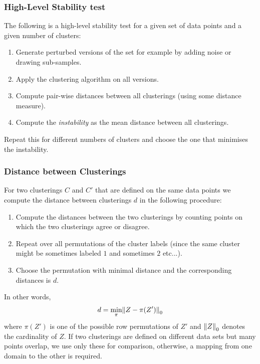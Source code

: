 \subsubsection{High-Level Stability test}
The following is a high-level stability test for a given set of data points and a given number of clusters:
\begin{enumerate}
    \item Generate perturbed versions of the set for example by adding noise or drawing sub-samples.
    \item Apply the clustering algorithm on all versions.
    \item Compute pair-wise distances between all clusterings (using some distance measure).
    \item Compute the \emph{instability} as the mean distance between all clusterings.
\end{enumerate}
Repeat this for different numbers of clusters and choose the one that minimises the instability.
\subsubsection{Distance between Clusterings}
For two clusterings $C$ and $C'$ that are defined on the same data points we compute the distance between clusterings $d$ in the following procedure:
\begin{enumerate}
    \item Compute the distances between the two clusterings by counting points on which the two clusterings agree or disagree.
    \item Repeat over all permutations of the cluster labels (since the same cluster might be sometimes labeled $1$ and sometimes $2$ etc...).
    \item Choose the permutation with minimal distance and the corresponding distances is $d$.
\end{enumerate}
In other words,
\begin{align*}
    d = \min_\pi \norm{Z-\pi(Z')}_0
\end{align*}
where $\pi(Z')$ is one of the possible row permutations of $Z'$ and $\left\lVert Z\right\rVert_0$ denotes the cardinality of $Z$.
If two clusterings are defined on different data sets but many points overlap, we use only these for comparison, otherwise, a mapping from one domain to the other is required.

